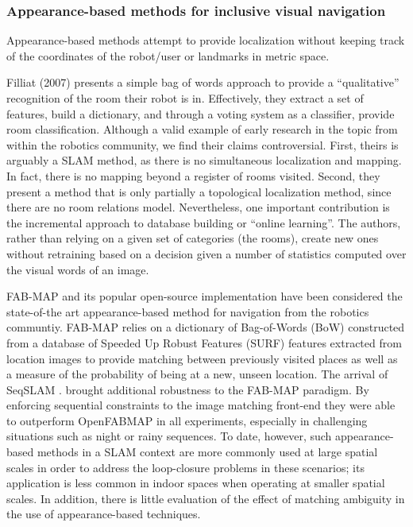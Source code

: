 \subsubsection{Appearance-based methods for inclusive visual navigation}

Appearance-based methods attempt to provide localization without keeping track of the coordinates of the robot/user or landmarks in metric space. 

Filliat (2007) presents a simple bag of words approach to provide a ``qualitative'' recognition of the room their robot is in. Effectively, they extract a set of features, build a dictionary, and through a voting system as a classifier, provide room classification. Although a valid example of early research in the topic from within the robotics community, we find their claims controversial. First, theirs is arguably a SLAM method, as there is no simultaneous localization and mapping. In fact, there is no mapping beyond a register of rooms visited. Second, they present a method that is only partially a topological localization method, since there are no room relations model. Nevertheless, one important contribution is the incremental approach to database building or ``online learning''. The authors, rather than relying on a given set of categories (the rooms), create new ones without retraining based on a decision given a number of statistics computed over the visual words of an image.

FAB-MAP \citep{cumminsFabMap2010} and its popular open-source implementation \citep{OpenFabMap2011} have been considered the state-of-the art appearance-based method for navigation from the robotics communtiy. FAB-MAP relies on a dictionary of Bag-of-Words (BoW) constructed from a database of Speeded Up Robust Features (SURF) features extracted from location images to provide matching between previously visited places as well as a measure of the probability of being at a new, unseen location. The arrival of SeqSLAM \cite{milford2012seqslam}.  brought additional robustness to the FAB-MAP paradigm. By enforcing sequential constraints to the image matching front-end they were able to outperform OpenFABMAP in all experiments, especially in challenging situations such as night or rainy sequences. To date, however, such appearance-based methods in a SLAM context are more commonly used at large spatial scales in order to address the loop-closure problems in these scenarios; its application is less common  in indoor spaces when operating at smaller spatial scales. In addition, there is little evaluation of the effect of matching ambiguity in the use of appearance-based techniques. 

